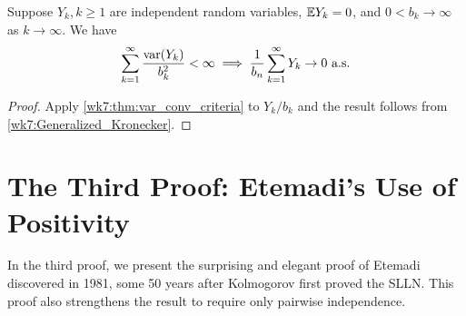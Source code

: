 \documentclass[12pt]{article}
\begin{document}
\begin{Theorem} Suppose $Y_k, k \geq 1$ are independent random variables, $\E Y_k = 0$, and $0< b_k \to \infty$ as $k\to\infty$. We have
\begin{align*}
\sum_{k=1}^{\infty} \frac{\operatorname{var}(Y_k)}{b_k^2} < \infty
\implies
\frac{1}{b_n} \sum_{k=1}^{\infty} Y_k \to 0 \ \text{a.s.}
\end{align*}
\end{Theorem}
\begin{proof}
Apply \cref{wk7:thm:var_conv_criteria} to $Y_k/b_k$ and the result follows from \cref{wk7:Generalized_Kronecker}.
\end{proof}

\section{The Third Proof: Etemadi's Use of Positivity}

In the third proof, we present the surprising and elegant proof of Etemadi discovered in 1981, some 50 years after Kolmogorov first proved the SLLN. This proof also strengthens the result to require only pairwise independence.
\end{document}
